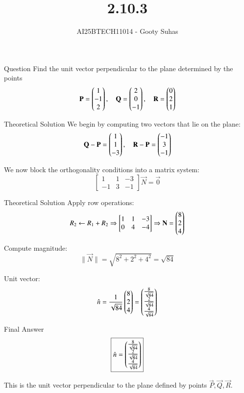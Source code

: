 \documentclass{beamer}
\title{2.10.3}
\author{AI25BTECH11014 - Gooty Suhas}
\begin{document}
\frame{\titlepage}

\begin{frame}{Question}
Find the unit vector perpendicular to the plane determined by the points
\[
\mathbf{P} = \begin{pmatrix}1 \\ -1 \\ 2\end{pmatrix}, \quad
\mathbf{Q} = \begin{pmatrix}2 \\ 0 \\ -1\end{pmatrix}, \quad
\mathbf{R} = \begin{pmatrix}0 \\ 2 \\ 1\end{pmatrix}
\]
\end{frame}

\begin{frame}{Theoretical Solution}
We begin by computing two vectors that lie on the plane:
\[
\mathbf{Q} - \mathbf{P} = \begin{pmatrix}1 \\ 1 \\ -3\end{pmatrix}, \quad
\mathbf{R} - \mathbf{P} = \begin{pmatrix}-1 \\ 3 \\ -1\end{pmatrix}
\]

We now block the orthogonality conditions into a matrix system:
\[
\begin{bmatrix}
1 & 1 & -3 \\
-1 & 3 & -1
\end{bmatrix}
\vec{N} = \vec{0}
\]
\end{frame}

\begin{frame}{Theoretical Solution}
Apply row operations:
\[
R_2 \leftarrow R_1 + R_2 \Rightarrow
\begin{bmatrix}
1 & 1 & -3 \\
0 & 4 & -4
\end{bmatrix}
\Rightarrow \mathbf{N} = \begin{pmatrix}8 \\ 2 \\ 4\end{pmatrix}
\]

Compute magnitude:
\[
\|\vec{N}\| = \sqrt{8^2 + 2^2 + 4^2} = \sqrt{84}
\]

Unit vector:
\[
\hat{n} = \frac{1}{\sqrt{84}} \begin{pmatrix}8 \\ 2 \\ 4\end{pmatrix}
= \begin{pmatrix}\frac{8}{\sqrt{84}} \\ \frac{2}{\sqrt{84}} \\ \frac{4}{\sqrt{84}}\end{pmatrix}
\]
\end{frame}

\begin{frame}{Final Answer}
\[
\boxed{
\hat{n} = \begin{pmatrix}\frac{8}{\sqrt{84}} \\ \frac{2}{\sqrt{84}} \\ \frac{4}{\sqrt{84}}\end{pmatrix}
}
\]

This is the unit vector perpendicular to the plane defined by points \( \vec{P}, \vec{Q}, \vec{R} \).
\end{frame}
\end{document}
